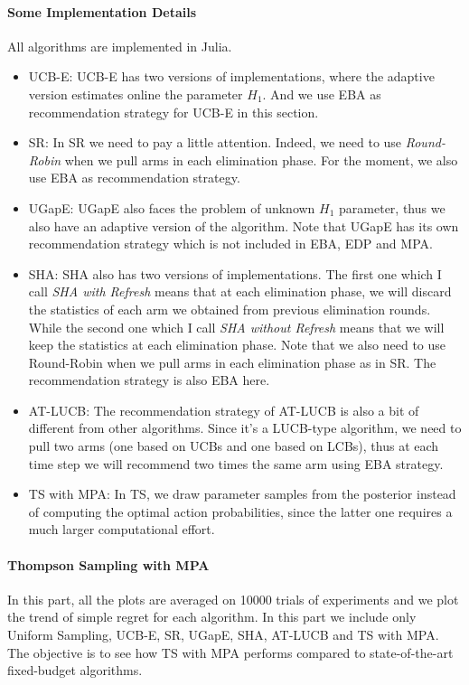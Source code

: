 \documentclass[runningheads,a4paper]{llncs}
\begin{document}
\paragraph{\bfseries{Some Implementation Details}}
All algorithms are implemented in Julia.
\begin{itemize}
	\item UCB-E: UCB-E has two versions of implementations, where the adaptive version estimates online the parameter $H_1$. And we use EBA as recommendation strategy for UCB-E in this section.
	\item SR: In SR we need to pay a little attention. Indeed, we need to use \textit{Round-Robin} when we pull arms in each elimination phase. For the moment, we also use EBA as recommendation strategy.
	\item UGapE: UGapE also faces the problem of unknown $H_1$ parameter, thus we also have an adaptive version of the algorithm. Note that UGapE has its own recommendation strategy which is not included in EBA, EDP and MPA.
	\item SHA: SHA also has two versions of implementations. The first one which I call \textit{SHA with Refresh} means that at each elimination phase, we will discard the statistics of each arm we obtained from previous elimination rounds. While the second one which I call \textit{SHA without Refresh} means that we will keep the statistics at each elimination phase. Note that we also need to use Round-Robin when we pull arms in each elimination phase as in SR. The recommendation strategy is also EBA here.
	\item AT-LUCB: The recommendation strategy of AT-LUCB is also a bit of different from other algorithms. Since it's a LUCB-type algorithm, we need to pull two arms (one based on UCBs and one based on LCBs), thus at each time step we will recommend two times the same arm using EBA strategy.
	\item TS with MPA: In TS, we draw parameter samples from the posterior instead of computing the optimal action probabilities, since the latter one requires a much larger computational effort.
\end{itemize}

\paragraph{\bfseries{Thompson Sampling with MPA}}
In this part, all the plots are averaged on 10000 trials of experiments and we plot the trend of simple regret for each algorithm. In this part we include only Uniform Sampling, UCB-E, SR, UGapE, SHA, AT-LUCB and TS with MPA. The objective is to see how TS with MPA performs compared to state-of-the-art fixed-budget algorithms.
\end{document}
